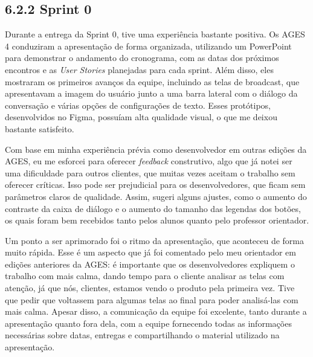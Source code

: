 \hypertarget{__RefHeading___Toc4470_3118176633}{}

\subsection*{6.2.2 Sprint 0}
\label{cliente-hoortech:text-h-0028}

\originaltab{}Durante a entrega da Sprint 0, tive uma experiência bastante positiva. Os AGES 4 conduziram a apresentação de forma organizada, utilizando um PowerPoint para demonstrar o andamento do cronograma, com as datas dos próximos encontros e as \textit{User Stories }planejadas para cada sprint. Além disso, eles mostraram os primeiros avanços da equipe, incluindo as telas de broadcast, que apresentavam a imagem do usuário junto a uma barra lateral com o diálogo da conversação e várias opções de configurações de texto. Esses protótipos, desenvolvidos no Figma, possuíam alta qualidade visual, o que me deixou bastante satisfeito.\par

Com base em minha experiência prévia como desenvolvedor em outras edições da AGES, eu me esforcei para oferecer \textit{feedback} construtivo, algo que já notei ser uma dificuldade para outros clientes, que muitas vezes aceitam o trabalho sem oferecer críticas. Isso pode ser prejudicial para os desenvolvedores, que ficam sem parâmetros claros de qualidade. Assim, sugeri alguns ajustes, como o aumento do contraste da caixa de diálogo e o aumento do tamanho das legendas dos botões, os quais foram bem recebidos tanto pelos alunos quanto pelo professor orientador.\par

Um ponto a ser aprimorado foi o ritmo da apresentação, que aconteceu de forma muito rápida. Esse é um aspecto que já foi comentado pelo meu orientador em edições anteriores da AGES: é importante que os desenvolvedores expliquem o trabalho com mais calma, dando tempo para o cliente analisar as telas com atenção, já que nós, clientes, estamos vendo o produto pela primeira vez. Tive que pedir que voltassem para algumas telas ao final para poder analisá-las com mais calma. Apesar disso, a comunicação da equipe foi excelente, tanto durante a apresentação quanto fora dela, com a equipe fornecendo todas as informações necessárias sobre datas, entregas e compartilhando o material utilizado na apresentação.\par

